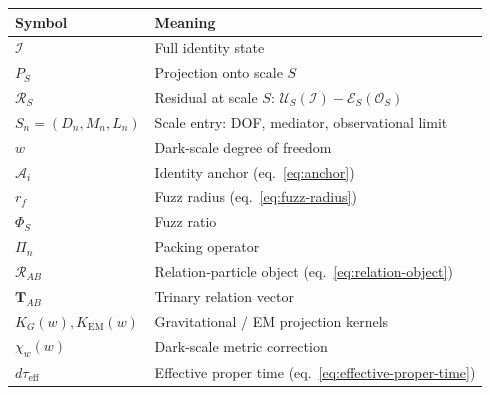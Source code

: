 \documentclass[11pt, a4paper, oneside]{article}
\theoremstyle{definition}
\theoremstyle{plain}
\theoremstyle{remark}
\newcommand{\Obs}{\mathcal{O}}
\begin{document}
\begin{tabular}{ll}
  \toprule
  Symbol & Meaning \\
  \midrule
  $\mathcal{I}$ & Full identity state \\
  $P_S$ & Projection onto scale $S$ \\
  $\mathcal{R}_S$ & Residual at scale $S$: $\mathcal{U}_S(\mathcal{I}) - \mathcal{E}_S(\Obs_S)$ \\
  $S_n = (D_n, M_n, L_n)$ & Scale entry: DOF, mediator, observational limit \\
  $w$ & Dark-scale degree of freedom \\
  $\mathcal{A}_i$ & Identity anchor (eq.~\ref{eq:anchor}) \\
  $r_f$ & Fuzz radius (eq.~\ref{eq:fuzz-radius}) \\
  $\Phi_S$ & Fuzz ratio \\
  $\Pi_n$ & Packing operator \\
  $\mathcal{R}_{AB}$ & Relation-particle object (eq.~\ref{eq:relation-object}) \\
  $\mathbf{T}_{AB}$ & Trinary relation vector \\
  $K_G(w), K_\text{EM}(w)$ & Gravitational / EM projection kernels \\
  $\chi_w(w)$ & Dark-scale metric correction \\
  $d\tau_\text{eff}$ & Effective proper time (eq.~\ref{eq:effective-proper-time}) \\
  \bottomrule
\end{tabular}
\end{document}
